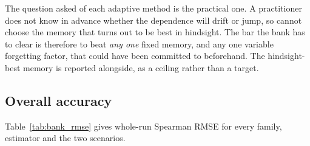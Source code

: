 The question asked of each adaptive method is the practical one. A practitioner does not know in
advance whether the dependence will drift or jump, so cannot choose the memory that turns out to
be best in hindsight. The bar the bank has to clear is therefore to beat \emph{any one} fixed
memory, and any one variable forgetting factor, that could have been committed to beforehand.
The hindsight-best memory is reported alongside, as a ceiling rather than a target.

\subsection{Overall accuracy}
\label{sec:overall}

Table~\ref{tab:bank_rmse} gives whole-run Spearman RMSE for every family, estimator and the two
scenarios.

